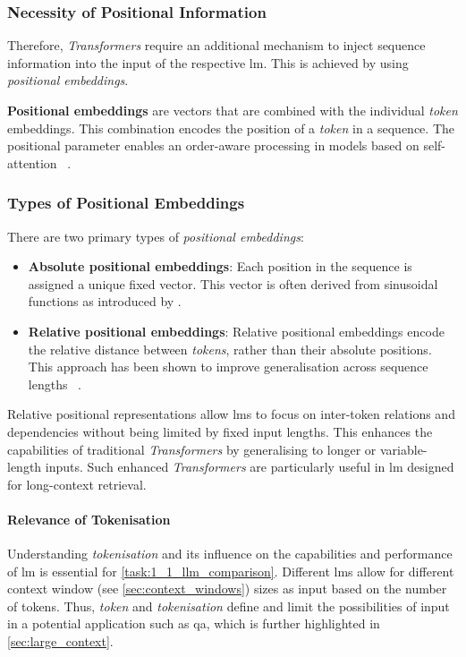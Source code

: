 \subsubsection{Necessity of Positional Information}
Therefore, \textit{Transformers} require an additional mechanism to inject sequence information into the input of the respective \ac{lm}.
This is achieved by using \textit{positional embeddings}.
%
\begin{definition}
\textbf{Positional embeddings} are vectors that are combined with the individual \textit{token} embeddings.
This combination encodes the position of a \textit{token} in a sequence.
The positional parameter enables an order-aware processing in models based on self-attention ~\citep{vaswani2017attention}.
\end{definition}
%
\subsubsection{Types of Positional Embeddings}

There are two primary types of \textit{positional embeddings}:
\begin{itemize}
    \item \textbf{Absolute positional embeddings}:
    Each position in the sequence is assigned a unique fixed vector.
    This vector is often derived from sinusoidal functions as introduced by \citet{vaswani2017attention}.
    \item \textbf{Relative positional embeddings}:
    Relative positional embeddings encode the relative distance between \textit{tokens}, rather than their absolute positions. 
    This approach has been shown to improve generalisation across sequence lengths ~\citep{shaw2018self, dai2019transformer}.
\end{itemize}
%
Relative positional representations allow \acp{lm} to focus on inter-token relations and dependencies without being limited by fixed input lengths.
This enhances the capabilities of traditional \textit{Transformers} by generalising to longer or variable-length inputs.
Such enhanced \textit{Transformers} are particularly useful in \ac{lm} designed for long-context retrieval.
%
\paragraph{Relevance of Tokenisation}
Understanding \textit{tokenisation} and its influence on the capabilities and performance of \ac{lm} is essential for \cref{task:1_1_llm_comparison}.
Different \acp{lm} allow for different context window (see \cref{sec:context_windows}) sizes as input based on the number of tokens.
Thus, \textit{token} and \textit{tokenisation} define and limit the possibilities of input in a potential application such as \ac{qa}, which is further highlighted in \cref{sec:large_context}.
%
